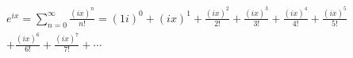 \documentclass[preview]{standalone}
\begin{document}
\begin{align*}
e^{ix} = \sum_{n=0}^{\infty} \frac{(ix)^n}{n!} = (1i)^0 + (ix)^1 + \frac{(ix)^2}{2!} + \frac{(ix)^3}{3!} + \frac{(ix)^4}{4!} + \frac{(ix)^5}{5!} \\ + \frac{(ix)^6}{6!} + \frac{(ix)^7}{7!} + \cdots
\end{align*}
\end{document}
